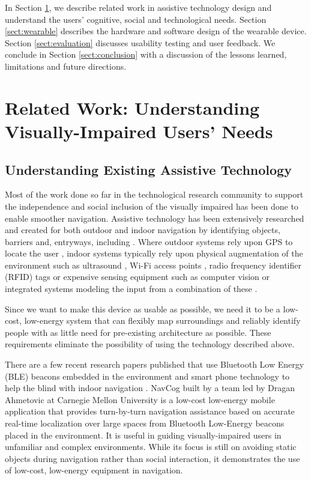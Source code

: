 In Section \ref{sect:background}, we describe related work in assistive technology design and understand the users' cognitive, social and technological needs. Section \ref{sect:wearable} describes the hardware and software design of the wearable device.  Section \ref{sect:evaluation} discusses usability testing and user feedback. We conclude in Section \ref{sect:conclusion} with a discussion of the lessons learned, limitations and future directions.

\section{Related Work: Understanding Visually-Impaired Users' Needs}
\label{sect:background}
\subsection{Understanding Existing Assistive Technology}
Most of the work done so far in the technological research community to support the independence and social inclusion of the visually impaired has been done to enable smoother navigation. Assistive technology has been extensively researched and created for both outdoor and indoor navigation by identifying objects, barriers and, entryways, including \cite{Bousbia-Salah:2007ab,Chumkamon:2008ab,Ivanov:2012ab,Ladetto:2002aa,Loomis:2006aa,Makino:1996ab,Ran:2004ab}. Where outdoor systems rely upon GPS to locate the user \cite{Loomis:2006aa,Makino:1996ab,Newman:2002aa}, indoor systems typically rely upon physical augmentation of the environment such as ultrasound \cite{Bousbia-Salah:2007ab,Ram:1998ab,Runge:2011aa}, Wi-Fi access points \cite{Evennou:2006:AIW:1288263.1288407,Rajamaki:2007aa}, radio frequency identifier (RFID) tags \cite{Chumkamon:2008ab,Na:2006aa,Willis:2004aa} or expensive sensing equipment such as computer vision \cite{Golding:1999ab,Ran:2004ab}   or  integrated systems modeling the input from a combination of these \cite{Yelamarthi:2010ab}. 

Since we want to make this device as usable as possible, we need it to be a low-cost, low-energy system that can flexibly map surroundings and reliably identify people with as little need for pre-existing architecture as possible. These requirements eliminate the possibility of using the technology described above.

There are a few recent research papers published that use Bluetooth Low Energy (BLE) beacons embedded in the environment and smart phone technology to help the blind with indoor navigation \cite{ahmetovic2016navcog, Duarte-K.:2014aa}. NavCog built by a team led by Dragan Ahmetovic at Carnegie Mellon University \cite{ahmetovic2016navcog} is a low-cost low-energy mobile application that provides turn-by-turn navigation assistance based on accurate real-time localization over large spaces from Bluetooth Low-Energy beacons placed in the environment. It is useful in guiding visually-impaired users in unfamiliar and complex environments. While its focus is still on avoiding static objects during navigation rather than social interaction, it demonstrates the use of low-cost, low-energy equipment in navigation.  

